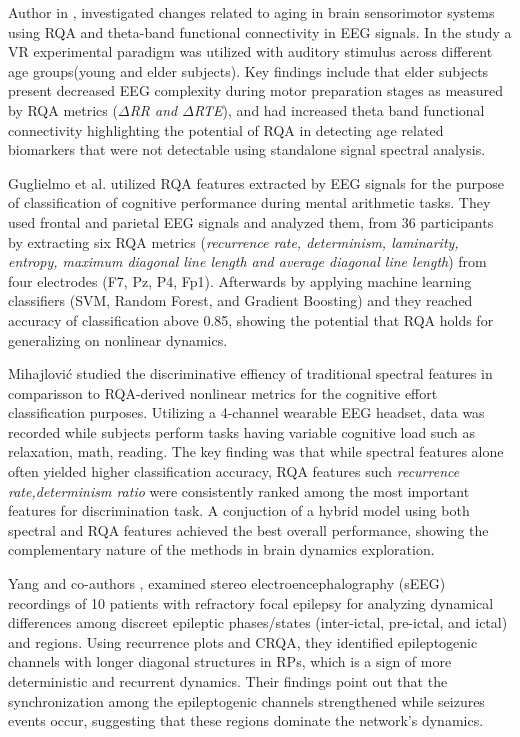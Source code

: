 \documentclass{article}
\begin{document}
			Author in \cite{pitsik}, investigated changes related to aging in 
			brain sensorimotor systems using 
			RQA and theta-band functional connectivity in EEG signals. 
			In the study a VR experimental paradigm was 
			utilized with auditory stimulus across different age groups(young and elder subjects). 
			Key findings include that elder subjects present 
			decreased EEG complexity during motor preparation stages as 
			measured by RQA metrics (\textit{$\Delta$RR and $\Delta$RTE}), 
			and had increased theta band functional connectivity 
			highlighting the potential of RQA in detecting 
			age related biomarkers that were not detectable using 
			standalone signal spectral analysis.

			Guglielmo et al. \cite{guglielmo}  
			utilized RQA features extracted 
			by EEG signals for the purpose of classification
			of cognitive performance during mental arithmetic tasks. 
			They used frontal and parietal EEG signals 
			and analyzed them, from 36 participants by extracting 
			six RQA metrics (\textit{recurrence rate, determinism, 
			laminarity, entropy, maximum diagonal line length and average diagonal line length}) 
			from four electrodes (F7, Pz, P4, Fp1). 
			Afterwards by applying machine learning classifiers 
			(SVM, Random Forest, and Gradient Boosting) and
			they reached accuracy of classification above 0.85, 
			showing the potential that RQA holds for 
			generalizing on nonlinear dynamics.
			
			Mihajlović \cite{mihajlovic19} studied the discriminative effiency of traditional spectral features 
			in comparisson to RQA-derived nonlinear metrics for the cognitive effort classification purposes. 
			Utilizing a 4-channel wearable EEG headset, data was recorded while subjects perform tasks
			having variable cognitive load such as relaxation, math, reading. 
			The key finding was that while spectral features alone often yielded higher classification accuracy, 
			RQA features such \textit{recurrence rate,determinism ratio} were consistently ranked among the 
			most important features for discrimination task. A conjuction of a hybrid model using both spectral and RQA features 
			achieved the best overall performance, showing the complementary nature of the methods in brain dynamics exploration. 


			Yang and co-authors \cite{yang2019dynamical}, examined stereo electroencephalography (sEEG) 
			recordings of 10 patients with refractory focal epilepsy for analyzing dynamical differences 
			among discreet epileptic phases/states (inter-ictal, pre-ictal, and ictal) and regions. 
			Using recurrence plots and CRQA, they identified epileptogenic channels with longer diagonal
			structures in RPs, which is a sign of more deterministic and recurrent dynamics. 
			Their findings point out that the synchronization among the epileptogenic channels strengthened 
			while seizures events occur, suggesting that these regions dominate the 
			network's dynamics.
\end{document}
